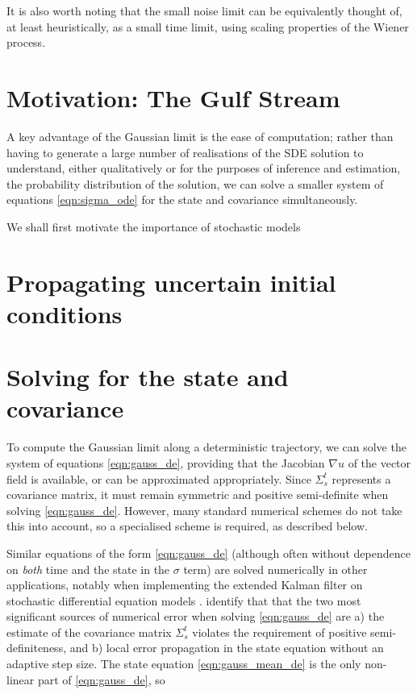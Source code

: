 It is also worth noting that the small noise limit can be equivalently thought of, at least heuristically, as a small time limit, using scaling properties of the Wiener process.



\section{Motivation: The Gulf Stream}

A key advantage of the Gaussian limit is the ease of computation; rather than having to generate a large number of realisations of the SDE solution to understand, either qualitatively or for the purposes of inference and estimation, the probability distribution of the solution, we can solve a smaller system of equations \eqref{eqn:sigma_ode} for the state and covariance simultaneously.

We shall first motivate the importance of stochastic models




\section{Propagating uncertain initial conditions}


\section{Solving for the state and covariance}
To compute the Gaussian limit along a deterministic trajectory, we can solve the system of equations \eqref{eqn:gauss_de}, providing that the Jacobian \(\nabla u\) of the vector field is available, or can be approximated appropriately.
Since \(\Sigma_s^t\) represents a covariance matrix, it must remain symmetric and positive semi-definite when solving \eqref{eqn:gauss_de}.
However, many standard numerical schemes do not take this into account, so a specialised scheme is required, as described below.

Similar equations of the form \eqref{eqn:gauss_de} (although often without dependence on \emph{both} time and the state in the \(\sigma\) term) are solved numerically in other applications, notably when implementing the extended Kalman filter on stochastic differential equation models \citep{Jazwinski_2014_StochasticProcessesFiltering, KulikovaKulikov_2014_AdaptiveODESolvers}.
\citet{KulikovaKulikov_2014_AdaptiveODESolvers} identify that that the two most significant sources of numerical error when solving \eqref{eqn:gauss_de} are a) the estimate of the covariance matrix \(\Sigma_s^t\) violates the requirement of positive semi-definiteness, and b) local error propagation in the state equation without an adaptive step size.
The state equation \eqref{eqn:gauss_mean_de} is the only non-linear part of \eqref{eqn:gauss_de}, so


